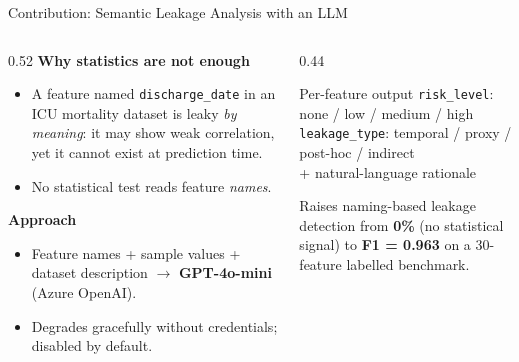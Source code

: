\documentclass[11pt,aspectratio=169]{beamer}
\begin{document}
\begin{frame}{Contribution: Semantic Leakage Analysis with an LLM}
  \begin{columns}[T]
    \begin{column}{0.52\textwidth}
      \textbf{Why statistics are not enough}
      \begin{itemize}\setlength\itemsep{0.5em}
        \item A feature named \texttt{discharge\_date} in an ICU mortality dataset is leaky \emph{by meaning}: it may show weak correlation, yet it cannot exist at prediction time.
        \item No statistical test reads feature \emph{names}.
      \end{itemize}
      \vspace{0.5em}
      \textbf{Approach}
      \begin{itemize}\setlength\itemsep{0.4em}
        \item Feature names + sample values + dataset description $\rightarrow$ \textbf{GPT-4o-mini} (Azure OpenAI).
        \item Degrades gracefully without credentials; disabled by default.
      \end{itemize}
    \end{column}
    \begin{column}{0.44\textwidth}
      \begin{block}{Per-feature output}
        \small
        \texttt{risk\_level}: none / low / medium / high \\[0.3em]
        \texttt{leakage\_type}: temporal / proxy / post-hoc / indirect \\[0.3em]
        + natural-language rationale
      \end{block}
      \vspace{0.4em}
      \footnotesize Raises naming-based leakage detection from \textbf{0\%} (no statistical signal) to \textbf{F1 = 0.963} on a 30-feature labelled benchmark.
    \end{column}
  \end{columns}
\end{frame}
\end{document}
